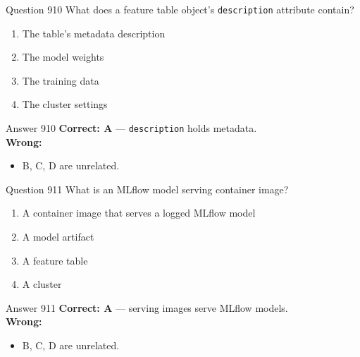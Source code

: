 \documentclass[aspectratio=169,11pt]{beamer}
\begin{document}
	\begin{frame}{Question 910}
		What does a feature table object's \texttt{description} attribute contain?
		\begin{enumerate}[label=\Alph*.]
			\item The table's metadata description
			\item The model weights
			\item The training data
			\item The cluster settings
		\end{enumerate}
	\end{frame}
	\begin{frame}{Answer 910}
		\textbf{Correct: A} --- \texttt{description} holds metadata.\\
		\vspace{0.5em}
		\textbf{Wrong:}
		\begin{itemize}
			\item B, C, D are unrelated.
		\end{itemize}
	\end{frame}
	
	\begin{frame}{Question 911}
		What is an MLflow model serving container image?
		\begin{enumerate}[label=\Alph*.]
			\item A container image that serves a logged MLflow model
			\item A model artifact
			\item A feature table
			\item A cluster
		\end{enumerate}
	\end{frame}
	\begin{frame}{Answer 911}
		\textbf{Correct: A} --- serving images serve MLflow models.\\
		\vspace{0.5em}
		\textbf{Wrong:}
		\begin{itemize}
			\item B, C, D are unrelated.
		\end{itemize}
	\end{frame}
	
\end{document}
